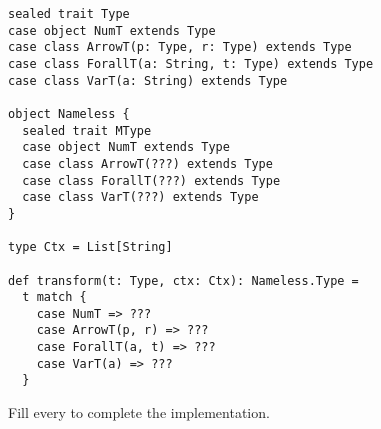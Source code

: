 \begin{enumerate}
\begin{verbatim}
sealed trait Type
case object NumT extends Type
case class ArrowT(p: Type, r: Type) extends Type
case class ForallT(a: String, t: Type) extends Type
case class VarT(a: String) extends Type

object Nameless {
  sealed trait MType
  case object NumT extends Type
  case class ArrowT(???) extends Type
  case class ForallT(???) extends Type
  case class VarT(???) extends Type
}

type Ctx = List[String]

def transform(t: Type, ctx: Ctx): Nameless.Type =
  t match {
    case NumT => ???
    case ArrowT(p, r) => ???
    case ForallT(a, t) => ???
    case VarT(a) => ???
  }
\end{verbatim}

Fill every  to complete the implementation.

\end{enumerate}
